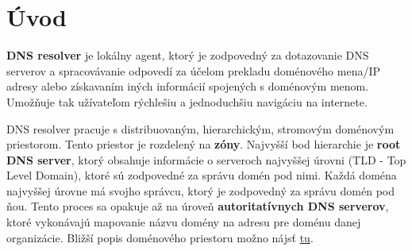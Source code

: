 
%

\chapter{Úvod}
\textbf{DNS resolver} je lokálny agent, ktorý je zodpovedný za dotazovanie DNS serverov a spracovávanie odpovedí za účelom prekladu doménového mena/IP adresy alebo získavaním iných informácií spojených s doménovým menom. Umožňuje tak užívateľom rýchlešiu a jednoduchšiu navigáciu na internete.~\cite{RFC1035}

DNS resolver pracuje s distribuovaným, hierarchickým, stromovým doménovým priestorom. Tento priestor je rozdelený na \textbf{zóny}. Najvyšší bod hierarchie je \textbf{root DNS server}, ktorý obsahuje informácie o serveroch najvyššej úrovni (TLD - Top Level Domain), ktoré sú zodpovedné za správu domén pod nimi. Každá doména najvyššej úrovne má svojho správcu, ktorý je zodpovedný za správu domén pod ňou. Tento proces sa opakuje až na úroveň \textbf{autoritatívnych DNS serverov}, ktoré vykonávajú mapovanie názvu domény na adresu pre doménu danej organizácie. Bližší popis doménového priestoru možno nájsť \href{https://www.rfc-editor.org/rfc/rfc1034.txt}{tu}.

